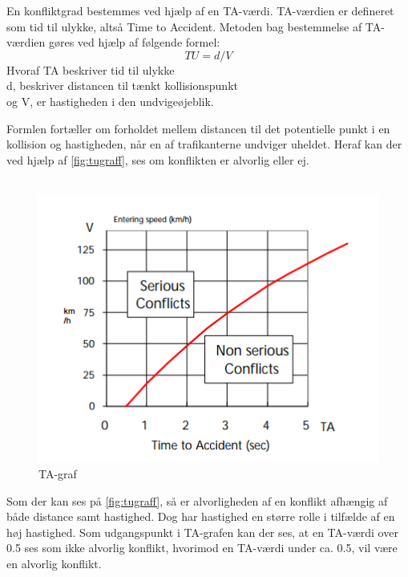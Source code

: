  En konfliktgrad bestemmes ved hjælp af en TA-værdi. TA-værdien er defineret som tid til ulykke, altså Time to Accident. Metoden bag bestemmelse af TA-værdien gøres ved hjælp af følgende formel:
 \begin{equation}
  TU=d/V
\end{equation}
Hvoraf TA beskriver tid til ulykke \\ d, beskriver distancen til tænkt kollisionspunkt \\ og V, er hastigheden i den undvigeøjeblik.

Formlen fortæller om forholdet mellem distancen til det potentielle punkt i en kollision og hastigheden, når en af trafikanterne undviger uheldet. Heraf kan der ved hjælp af \cref{fig:tugraff}, ses om konflikten er alvorlig eller ej.
~\\\\

\begin{figure}[htbp]
  \label{fig:tagraff}
  \centering
  \begin{adjustbox}{max width=\textwidth}
    \includegraphics{billederogfigur/tugraf.png} %
 \end{adjustbox}
  \caption{TA-graf}
\end{figure}

Som der kan ses på \cref{fig:tugraff}, så er alvorligheden af en konflikt afhængig af både distance samt hastighed. Dog har hastighed en større rolle i tilfælde af en høj hastighed.
Som udgangspunkt i TA-grafen kan der ses, at en TA-værdi over 0.5 ses som ikke alvorlig konflikt, hvorimod en TA-værdi under ca. 0.5, vil være en alvorlig konflikt.





